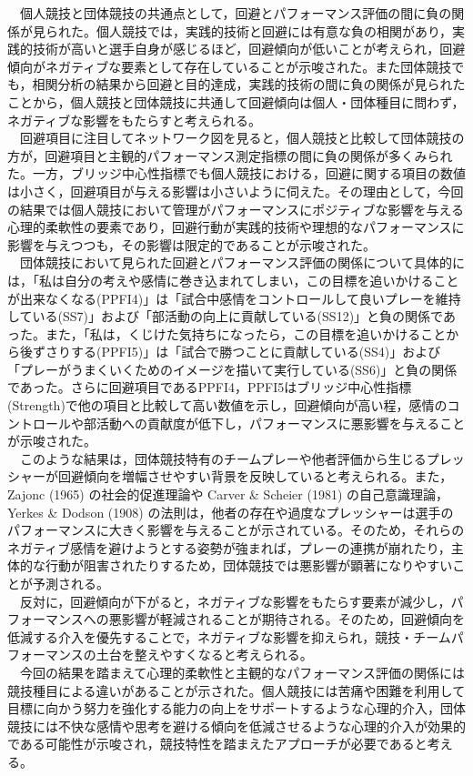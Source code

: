 \documentclass[12pt,a4paper,xelatex,ja=standard]{bxjsarticle}
\begin{document}
　個人競技と団体競技の共通点として，回避とパフォーマンス評価の間に負の関係が見られた。個人競技では，実践的技術と回避には有意な負の相関があり，実践的技術が高いと選手自身が感じるほど，回避傾向が低いことが考えられ，回避傾向がネガティブな要素として存在していることが示唆された。また団体競技でも，相関分析の結果から回避と目的達成，実践的技術の間に負の関係が見られたことから，個人競技と団体競技に共通して回避傾向は個人・団体種目に問わず，ネガティブな影響をもたらすと考えられる。\\
　回避項目に注目してネットワーク図を見ると，個人競技と比較して団体競技の方が，回避項目と主観的パフォーマンス測定指標の間に負の関係が多くみられた。一方，ブリッジ中心性指標でも個人競技における，回避に関する項目の数値は小さく，回避項目が与える影響は小さいように伺えた。その理由として，今回の結果では個人競技において管理がパフォーマンスにポジティブな影響を与える心理的柔軟性の要素であり，回避行動が実践的技術や理想的なパフォーマンスに影響を与えつつも，その影響は限定的であることが示唆された。\\
　団体競技において見られた回避とパフォーマンス評価の関係について具体的には，「私は自分の考えや感情に巻き込まれてしまい，この目標を追いかけることが出来なくなる(PPFI4)」は「試合中感情をコントロールして良いプレーを維持している(SS7)」および「部活動の向上に貢献している(SS12)」と負の関係であった。また，「私は，くじけた気持ちになったら，この目標を追いかけることから後ずさりする(PPFI5)」は「試合で勝つことに貢献している(SS4)」および「プレーがうまくいくためのイメージを描いて実行している(SS6)」と負の関係であった。さらに回避項目であるPPFI4，PPFI5はブリッジ中心性指標(Strength)で他の項目と比較して高い数値を示し，回避傾向が高い程，感情のコントロールや部活動への貢献度が低下し，パフォーマンスに悪影響を与えることが示唆された。\\
　このような結果は，団体競技特有のチームプレーや他者評価から生じるプレッシャーが回避傾向を増幅させやすい背景を反映していると考えられる。また，Zajonc
(1965) の社会的促進理論や Carver \& Scheier (1981)
の自己意識理論，Yerkes \& Dodson (1908)
の法則は，他者の存在や過度なプレッシャーは選手のパフォーマンスに大きく影響を与えることが示されている。そのため，それらのネガティブ感情を避けようとする姿勢が強まれば，プレーの連携が崩れたり，主体的な行動が阻害されたりするため，団体競技では悪影響が顕著になりやすいことが予測される。\\
　反対に，回避傾向が下がると，ネガティブな影響をもたらす要素が減少し，パフォーマンスへの悪影響が軽減されることが期待される。そのため，回避傾向を低減する介入を優先することで，ネガティブな影響を抑えられ，競技・チームパフォーマンスの土台を整えやすくなると考えられる。\\
　今回の結果を踏まえて心理的柔軟性と主観的なパフォーマンス評価の関係には競技種目による違いがあることが示された。個人競技には苦痛や困難を利用して目標に向かう努力を強化する能力の向上をサポートするような心理的介入，団体競技には不快な感情や思考を避ける傾向を低減させるような心理的介入が効果的である可能性が示唆され，競技特性を踏まえたアプローチが必要であると考える。
\end{document}
